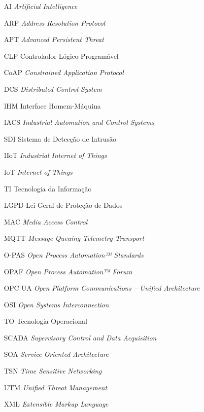 \begin{siglas}
    \item[AI] \textit{Artificial Intelligence}
    \item[ARP] \textit{Address Resolution Protocol}
    \item[APT] \textit{Advanced Persistent Threat}
    \item[CLP] Controlador Lógico Programável
    \item[CoAP] \textit{Constrained Application Protocol}
    \item[DCS] \textit{Distributed Control System}
    \item[IHM] Interface Homem-Máquina
    \item[IACS] \textit{Industrial Automation and Control Systems}
    \item[SDI] Sistema de Detecção de Intrusão
    \item[IIoT] \textit{Industrial Internet of Things}
    \item[IoT] \textit{Internet of Things}
    \item[TI] Tecnologia da Informação
    \item[LGPD] Lei Geral de Proteção de Dados
    \item[MAC] \textit{Media Access Control}
    \item[MQTT] \textit{Message Queuing Telemetry Transport}
    \item[O-PAS] \textit{Open Process Automation™ Standards}
    \item[OPAF] \textit{Open Process Automation™ Forum}
    \item[OPC UA] \textit{Open Platform Communications – Unified Architecture}
    \item[OSI] \textit{Open Systems Interconnection}
    \item[TO] Tecnologia Operacional
    \item[SCADA] \textit{Supervisory Control and Data Acquisition}
    \item[SOA] \textit{Service Oriented Architecture}
    \item[TSN] \textit{Time Sensitive Networking}
    \item[UTM] \textit{Unified Threat Management}
    \item[XML] \textit{Extensible Markup Language}
\end{siglas}

